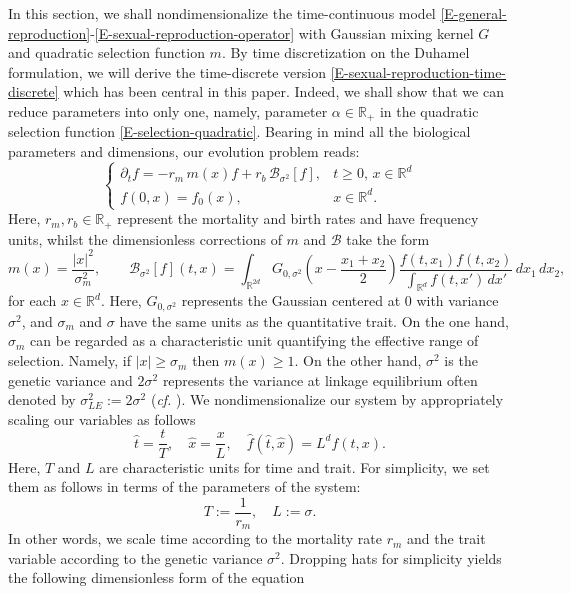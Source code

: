 \documentclass[reqno]{amsart}
\numberwithin{equation}{section}
\begin{document}
{In this section, we shall nondimensionalize the time-continuous model \eqref{E-general-reproduction}-\eqref{E-sexual-reproduction-operator} with Gaussian mixing kernel $G$ and quadratic selection function $m$. By time discretization on the Duhamel formulation, we will derive the time-discrete version \eqref{E-sexual-reproduction-time-discrete} which has been central in this paper. Indeed, we shall show that we can reduce parameters into only one, namely, parameter $\alpha\in \mathbb{R}_+$ in the quadratic selection function \eqref{E-selection-quadratic}. Bearing in mind all the biological parameters and dimensions, our evolution problem reads:
\begin{equation}\label{E-sexual-reproduction-time-continuous-all-parameters}
\left\{\begin{array}{ll}
\partial_t f =-r_m\,m(x)f+r_b\,\mathcal{B}_{\sigma^2}[f], & t\geq 0,\,x\in \mathbb{R}^d\\
f(0,x)=f_0(x), & x\in \mathbb{R}^d.
\end{array}\right.
\end{equation}
Here, $r_m,r_b\in \mathbb{R}_+$ represent the mortality and birth rates and have frequency units, whilst the dimensionless corrections of $m$ and $\mathcal{B}$ take the form
$$
m(x)=\frac{\vert x\vert^2}{\sigma_m^2},\qquad
\mathcal{B}_{\sigma^2}[f](t,x)=\int_{\mathbb{R}^{2d}}G_{0,\sigma^2}\left(x-\frac{x_1+x_2}{2}\right)\frac{f(t,x_1)f(t,x_2)}{\int_{\mathbb{R}^d} f(t,x')\,dx'}\,dx_1\,dx_2,$$
for each $x\in \mathbb{R}^d$. Here, $G_{0,\sigma^2}$ represents the Gaussian centered at $0$ with variance $\sigma^2$, and  $\sigma_m$ and $\sigma$ have the same units as the quantitative trait. On the one hand, $\sigma_m$ can be regarded as a characteristic unit quantifying the effective range of selection. Namely, if $\vert x\vert \geq \sigma_m$ then $m(x)\geq 1$. On the other hand, $\sigma^2$ is the genetic variance and $2\sigma^2$ represents the variance at linkage equilibrium often denoted by $\sigma_{LE}^2:=2\sigma^2$ ({\em cf.} \cite{B-80}). We nondimensionalize our system by appropriately scaling our variables as follows 
$$\widehat{t}=\frac{t}{T},\quad \widehat{x}=\frac{x}{L},\quad \widehat{f}(\widehat{t},\widehat{x})=L^d f(t,x).$$
Here, $T$ and $L$ are characteristic units for time and trait. For simplicity, we set them as follows in terms of the parameters of the system:
$$T:=\frac{1}{r_m},\quad L:=\sigma.$$
In other words, we scale time according to the mortality rate $r_m$ and the trait variable according to the genetic variance $\sigma^2$. Dropping hats for simplicity yields the following dimensionless form of the equation
}
\end{document}

